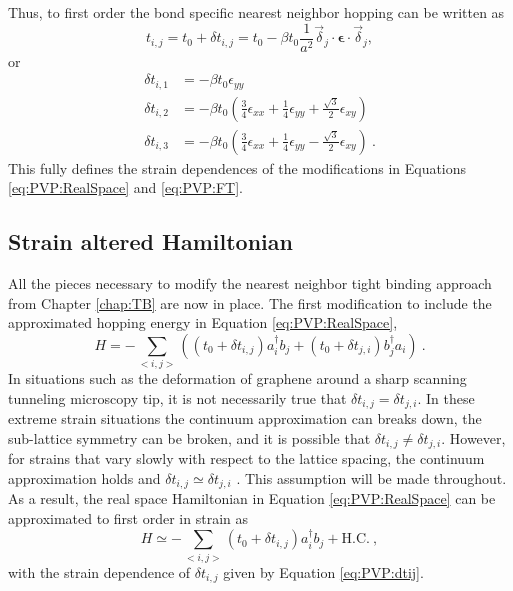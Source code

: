 Thus, to first order the bond specific nearest neighbor hopping can be written as
\begin{equation*}
  t_{i,j}=t_0+\delta t_{i,j}=t_0-\beta t_0 \frac{1}{a^2} \vec{\delta}_{j} \cdot \bm{\epsilon} \cdot \vec{\delta}_{j},
\end{equation*}
or
\begin{align}
  \delta t_{i,1}&=-\beta t_0 \epsilon_{yy} \nonumber \\
  \delta t_{i,2}&=-\beta t_0 \left( \frac{3}{4}\epsilon_{xx} +\frac{1}{4} \epsilon_{yy} + \frac{\sqrt{3}}{2} \epsilon_{xy} \right) \nonumber \\
  \delta t_{i,3}&=-\beta t_0 \left( \frac{3}{4}\epsilon_{xx} +\frac{1}{4} \epsilon_{yy} - \frac{\sqrt{3}}{2} \epsilon_{xy} \right)  \label{eq:PVP:dtij}\ .
\end{align}
This fully defines the strain dependences of the modifications in Equations \ref{eq:PVP:RealSpace} and \ref{eq:PVP:FT}.

\subsection{Strain altered Hamiltonian}
All the pieces necessary to modify the nearest neighbor tight binding approach from Chapter \ref{chap:TB} are now in place.
The first modification to include the approximated hopping energy in Equation \ref{eq:PVP:RealSpace},
\begin{equation*}
  H=-\sum_{<i,j>} \left( (t_0+\delta t_{i,j})  a_i^{\dagger} b_j + (t_0+\delta t_{j,i}) b_j^{\dagger} a_i \right) \ .
\end{equation*}
In situations such as the deformation of graphene around a sharp scanning tunneling microscopy tip, it is not necessarily true that $\delta t_{i,j} = \delta t_{j,i}$.
In these extreme strain situations the continuum approximation can breaks down, the sub-lattice symmetry can be broken, and it is possible that $\delta t_{i,j} \neq \delta t_{j,i}$.
However, for strains that vary slowly with respect to the lattice spacing, the continuum approximation holds and $\delta t_{i,j} \simeq \delta t_{j,i}$ \cite{Sloan2013}.
This assumption will be made throughout.
As a result, the real space Hamiltonian in Equation \ref{eq:PVP:RealSpace} can be approximated to first order in strain as
\begin{equation*}
  H \simeq -\sum_{<i,j>} \left( t_0+\delta t_{i,j} \right)  a_i^{\dagger} b_j + \text{H.C.} \ ,
\end{equation*}
with the strain dependence of $\delta t_{i,j}$ given by Equation \ref{eq:PVP:dtij}.


